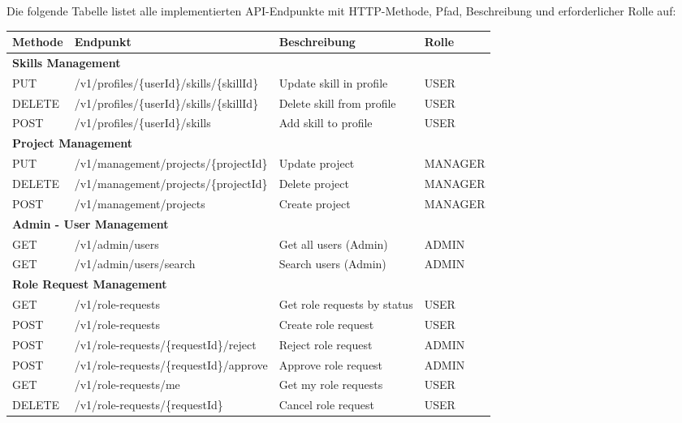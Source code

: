 Die folgende Tabelle listet alle implementierten API-Endpunkte mit HTTP-Methode, Pfad, Beschreibung und erforderlicher Rolle auf:

\begin{table}[H]
\centering
\tiny
{}
\begin{tabularx}{\textwidth}{|l|l|X|l|}
\hline
\rowcolor{EDAGDunkelgrau!30}
\textbf{Methode} & \textbf{Endpunkt} & \textbf{Beschreibung} & \textbf{Rolle} \\
\hline
\multicolumn{4}{|l|}{\cellcolor{EDAGDunkelgrau!10}\textbf{Skills Management}} \\
\hline
PUT & /v1/profiles/\{userId\}/skills/\{skillId\} & Update skill in profile & USER \\
\hline
DELETE & /v1/profiles/\{userId\}/skills/\{skillId\} & Delete skill from profile & USER \\
\hline
POST & /v1/profiles/\{userId\}/skills & Add skill to profile & USER \\
\hline

\multicolumn{4}{|l|}{\cellcolor{EDAGDunkelgrau!10}\textbf{Project Management}} \\
\hline
PUT & /v1/management/projects/\{projectId\} & Update project & MANAGER \\
\hline
DELETE & /v1/management/projects/\{projectId\} & Delete project & MANAGER \\
\hline
POST & /v1/management/projects & Create project & MANAGER \\
\hline

\multicolumn{4}{|l|}{\cellcolor{EDAGDunkelgrau!10}\textbf{Admin - User Management}} \\
\hline
GET & /v1/admin/users & Get all users (Admin) & ADMIN \\
\hline
GET & /v1/admin/users/search & Search users (Admin) & ADMIN \\
\hline

\multicolumn{4}{|l|}{\cellcolor{EDAGDunkelgrau!10}\textbf{Role Request Management}} \\
\hline
GET & /v1/role-requests & Get role requests by status & USER \\
\hline
POST & /v1/role-requests & Create role request & USER \\
\hline
POST & /v1/role-requests/\{requestId\}/reject & Reject role request & ADMIN \\
\hline
POST & /v1/role-requests/\{requestId\}/approve & Approve role request & ADMIN \\
\hline
GET & /v1/role-requests/me & Get my role requests & USER \\
\hline
DELETE & /v1/role-requests/\{requestId\} & Cancel role request & USER \\
\hline


\end{tabularx}
\end{table}
